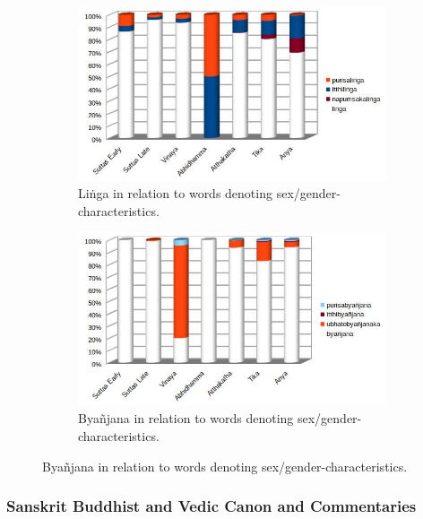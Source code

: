 \begin{figure}[!h]
  \begin{subfigure}{0.496\linewidth}
    \includegraphics[width=\linewidth]{pali_linga.jpg}
    \caption{Liṅga in relation to words denoting sex/gender-characteristics.}
  \end{subfigure}
  \hfill
  \begin{subfigure}{0.504\linewidth}
    \includegraphics[width=\linewidth]{pali_byanyana.jpg}
    \caption{Byañjana in relation to words denoting sex/gender-characteristics.}
  \end{subfigure}
\setcounter{figure}{12}
\label{itthi3}
\end{figure}


\newpage
\subsubsection*{Sanskrit Buddhist and Vedic Canon and Commentaries}

